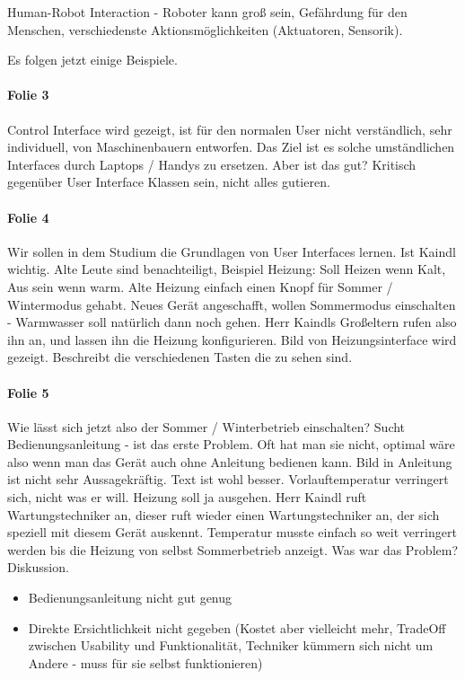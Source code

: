 Human-Robot Interaction - Roboter kann groß sein, Gefährdung für den Menschen,
verschiedenste Aktionsmöglichkeiten (Aktuatoren, Sensorik).

Es folgen jetzt einige Beispiele.

\paragraph{Folie 3}
Control Interface wird gezeigt, ist für den normalen User nicht verständlich,
sehr individuell, von Maschinenbauern entworfen. Das Ziel ist es solche umständlichen
Interfaces durch Laptops / Handys zu ersetzen. Aber ist das gut? Kritisch gegenüber 
User Interface Klassen sein, nicht alles gutieren.

\paragraph{Folie 4}
Wir sollen in dem Studium die Grundlagen von User Interfaces lernen. Ist Kaindl wichtig.
Alte Leute sind benachteiligt, Beispiel Heizung: Soll Heizen wenn Kalt, Aus sein wenn warm.
Alte Heizung einfach einen Knopf für Sommer / Wintermodus gehabt. Neues Gerät angeschafft,
wollen Sommermodus einschalten - Warmwasser soll natürlich dann noch gehen.
Herr Kaindls Großeltern rufen also ihn an, und lassen ihn die Heizung konfigurieren. 
Bild von Heizungsinterface wird gezeigt. Beschreibt die verschiedenen Tasten die zu 
sehen sind. 

\paragraph{Folie 5}
Wie lässt sich jetzt also der Sommer / Winterbetrieb einschalten? Sucht
Bedienungsanleitung - ist das erste Problem. Oft hat man sie nicht, optimal wäre
also wenn man das Gerät auch ohne Anleitung bedienen kann. 
Bild in Anleitung ist nicht sehr Aussagekräftig. Text ist wohl besser. 
Vorlauftemperatur verringert sich, nicht was er will. Heizung soll ja ausgehen.
Herr Kaindl ruft Wartungstechniker an, dieser ruft wieder einen Wartungstechniker an,
der sich speziell mit diesem Gerät auskennt. 
Temperatur musste einfach so weit verringert werden bis die Heizung von selbst
Sommerbetrieb anzeigt. 
Was war das Problem? Diskussion.
\begin{itemize}
\item Bedienungsanleitung nicht gut genug
\item Direkte Ersichtlichkeit nicht gegeben (Kostet aber vielleicht mehr, TradeOff
zwischen Usability und Funktionalität, Techniker kümmern sich nicht um Andere - 
muss für sie selbst funktionieren)
\end{itemize}

